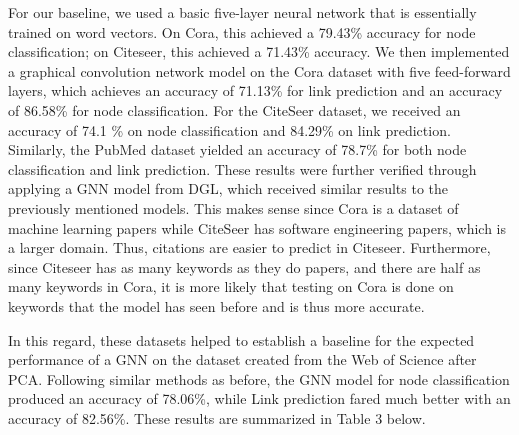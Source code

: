 \documentclass[conference]{IEEEtran}
\begin{document}
For our baseline, we used a basic five-layer neural network that is essentially trained on word 
vectors. On Cora, this achieved a 79.43\% accuracy for node classification; 
on Citeseer, this achieved a 71.43\% accuracy. We then implemented a graphical 
convolution network model on the Cora dataset with five feed-forward layers, which 
achieves an accuracy of 71.13\% for link prediction and an accuracy of  86.58\% for 
node classification. For the CiteSeer dataset, we received an accuracy of 74.1
\% on node classification and 84.29\% on link prediction. Similarly, the PubMed dataset 
yielded an accuracy of 78.7\% for both node classification and link prediction. 
These results were further verified through applying a GNN model from DGL, which received 
similar results to the previously mentioned models. This makes sense since Cora is a dataset 
of machine learning papers while CiteSeer has software engineering papers, which is a larger 
domain. Thus, citations are easier to predict in Citeseer. Furthermore, since Citeseer 
has as many keywords as they do papers, and there are half as many keywords in Cora, 
it is more likely that testing on Cora is done on keywords that the model has seen 
before and is thus more accurate. \par

In this regard, these datasets helped to establish a baseline for the expected performance 
of a GNN on the dataset created from the Web of Science after PCA. Following similar methods as 
before, the GNN model for node classification produced an accuracy of 78.06\%, 
while Link prediction fared much better with an accuracy of 82.56\%. 
These results are summarized in Table 3 below. \par 
\end{document}
